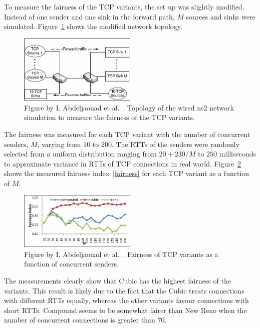 To measure the fairness of the TCP variants, the set up was slightly modified. Instead of one sender and one sink in the forward path, $M$ sources and sinks were simulated. Figure~\ref{fig:topology2} shows the modified network topology.

\begin{figure}
	\includegraphics[width=0.5\textwidth]{images/abdeljaouad10_topology_2.png}
	\caption{Figure by I. Abdeljaouad et al.~\cite{Abdeljaouad10}. Topology of the wired ns2 network simulation to measure the fairness of the TCP variants.}
	\label{fig:topology2}
\end{figure}

The fairness was measured for each TCP variant with the number of concurrent senders, $M$, varying from 10 to 200. The RTTs of the senders were randomly selected from a uniform distribution ranging from $20 + 230/M$ to $250$ milliseconds to approximate variance in RTTs of TCP connections in real world. Figure~\ref{fig:fairness1} shows the measured fairness index~\eqref{fairness} for each TCP variant as a function of $M$.

\begin{figure}
	\includegraphics[width=0.5\textwidth]{images/abdeljaouad10_fairness_1.png}
	\caption{Figure by I. Abdeljaouad et al.~\cite{Abdeljaouad10}. Fairness of TCP variants as a function of concurrent senders.}
	\label{fig:fairness1}
\end{figure}

The measurements clearly show that Cubic has the highest fairness of the variants. This result is likely due to the fact that the Cubic treats connections with different RTTs equally, whereas the other variants favour connections with short RTTs. Compound seems to be somewhat fairer than New Reno when the number of concurrent connections is greater than 70. 

